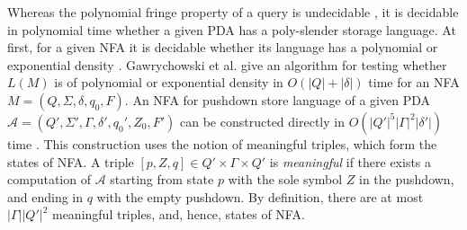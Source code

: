Whereas the polynomial fringe property of a query is undecidable \cite{Ullman}, it is decidable in polynomial time whether a given PDA has a poly-slender storage language. At first, for a given NFA it is decidable whether its language has a polynomial or exponential density \cite*{sparseness, poldens}. Gawrychowski et al. \cite{Gawrychowski} give an algorithm for testing whether $L(M)$ is of polynomial or exponential density in $O(|Q| + |\delta|)$ time for an NFA $M = (Q,\Sigma,\delta ,q_{0},F)$. An NFA for pushdown store language of a given PDA $\mathcal{A} = (Q', \Sigma', \Gamma, \delta', q_0', Z_0, F')$ can be constructed directly in $O({|Q'|}^5{|\Gamma|}^2|\delta'|)$ time \cite{Malcher}. This construction uses the notion of meaningful triples, which form the states of NFA. A triple $[p, Z, q] \in Q' \times \Gamma \times Q'$ is \textit{meaningful} if there exists a computation of $\mathcal{A}$ starting from state $p$ with the sole symbol $Z$ in the pushdown, and ending in $q$ with the empty pushdown. By definition, there are at most $|\Gamma|{|Q'|}^2$ meaningful triples, and, hence, states of NFA. 